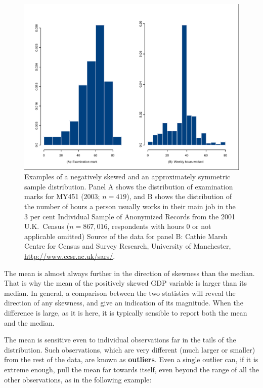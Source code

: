 \documentclass[11pt,a4paper,openany]{book}
\begin{document}
\begin{figure}[htbp]
\centering
\includegraphics[width=14.00000cm]{twohists.pdf}
\caption{\label{fig:f-skews} Examples of a negatively skewed and an
approximately symmetric sample distribution. Panel A shows the
distribution of examination marks for MY451 (2003; \(n=419\)), and B
shows the distribution of the number of hours a person usually works in
their main job in the 3 per cent Individual Sample of Anonymized Records
from the 2001 U.K.~Census (\(n=867,016\), respondents with hours 0 or
not applicable omitted) Source of the data for panel B: Cathie Marsh
Centre for Census and Survey Research, University of Manchester,
\url{http://www.ccsr.ac.uk/sars/}.}
\end{figure}

The mean is almost always further in the direction of skewness than the
median. That is why the mean of the positively skewed GDP variable is
larger than its median. In general, a comparison between the two
statistics will reveal the direction of any skewness, and give an
indication of its magnitude. When the difference is large, as it is
here, it is typically sensible to report both the mean and the median.

The mean is sensitive even to individual observations far in the tails
of the distribution. Such observations, which are very different (much
larger or smaller) from the rest of the data, are known as
\textbf{outliers}. Even a single outlier can, if it is extreme enough,
pull the mean far towards itself, even beyond the range of all the other
observations, as in the following example:
\end{document}
